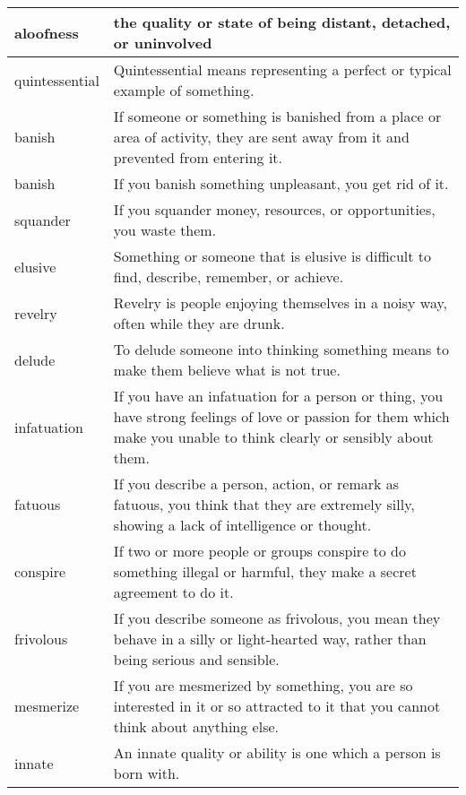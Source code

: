 \documentclass{article}
\begin{document}
\begin{center}
\begin{longtable}{|l|p{7.8cm}|}
\hline
aloofness
&
the quality or state of being distant, detached, or uninvolved
\\

\hline
quintessential
&
Quintessential means representing a perfect or typical example of something.
\\

\hline
banish
&
If someone or something is banished from a place or area of activity, they are sent away from it and prevented from entering it.
\\

\hline
banish
&
If you banish something unpleasant, you get rid of it.
\\

\hline
squander
&
If you squander money, resources, or opportunities, you waste them.
\\

\hline
elusive
&
Something or someone that is elusive is difficult to find, describe, remember, or achieve.
\\

\hline
revelry
&
Revelry is people enjoying themselves in a noisy way, often while they are drunk.
\\

\hline
delude
&
To delude someone into thinking something means to make them believe what is not true.
\\

\hline
infatuation
&
If you have an infatuation for a person or thing, you have strong feelings of love or passion for them which make you unable to think clearly or sensibly about them.
\\

\hline
fatuous
&
If you describe a person, action, or remark as fatuous, you think that they are extremely silly, showing a lack of intelligence or thought.
\\

\hline
conspire
&
If two or more people or groups conspire to do something illegal or harmful, they make a secret agreement to do it.
\\

\hline
frivolous
&
If you describe someone as frivolous, you mean they behave in a silly or light-hearted way, rather than being serious and sensible.
\\

\hline
mesmerize
&
If you are mesmerized by something, you are so interested in it or so attracted to it that you cannot think about anything else.
\\

\hline
innate
&
An innate quality or ability is one which a person is born with.
\\

\hline

\end{longtable}
\end{center}
\end{document}
